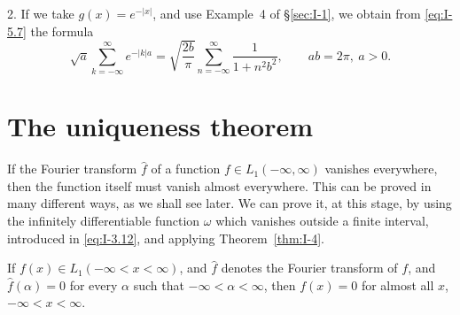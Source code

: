 2. If we take $g(x)=e^{-|x|}$, and use Example~4 of \S\ref{sec:I-1}, we obtain from \eqref{eq:I-5.7} the formula
\begin{equation}\label{eq:I-5.9}
\sqrt{a}\sum_{k=-\infty}^{\infty}e^{-|k|a}
=\sqrt{\frac{2b}{\pi}}\sum_{n=-\infty}^{\infty}\frac{1}{1+n^2b^2},
\qquad ab=2\pi,\ a>0.
\end{equation}

\section{The uniqueness theorem}
\label{sec:I-6}

If the Fourier transform $\hat f$ of a function $f\in L_1(-\infty,\infty)$ vanishes everywhere, then the function itself must vanish almost everywhere. This can be proved in many different ways, as we shall see later. We can prove it, at this stage, by using the infinitely differentiable function $\omega$ which vanishes outside a finite interval, introduced in \eqref{eq:I-3.12}, and applying Theorem~\ref{thm:I-4}.

\begin{theorem}\label{thm:I-7}
If $f(x)\in L_1(-\infty<x<\infty)$, and $\hat f$ denotes the Fourier transform of $f$, and $\hat f(\alpha)=0$ for every $\alpha$ such that $-\infty<\alpha<\infty$, then $f(x)=0$ for almost all $x$, $-\infty<x<\infty$.
\end{theorem}

